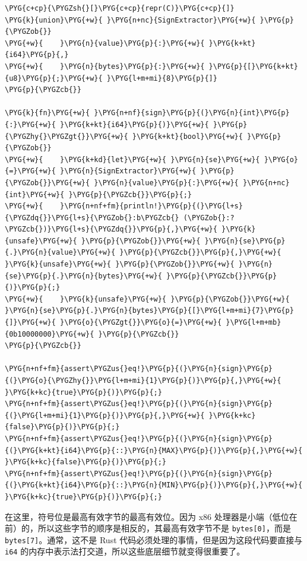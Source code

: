 \begin{Verbatim}[commandchars=\\\{\},breaklines=true,breakanywhere=true,fontsize=\codefont,xleftmargin=17bp]
\PYG{c+cp}{\PYGZsh{}[}\PYG{c+cp}{repr(C)}\PYG{c+cp}{]}
\PYG{k}{union}\PYG{+w}{ }\PYG{n+nc}{SignExtractor}\PYG{+w}{ }\PYG{p}{\PYGZob{}}
\PYG{+w}{    }\PYG{n}{value}\PYG{p}{:}\PYG{+w}{ }\PYG{k+kt}{i64}\PYG{p}{,}
\PYG{+w}{    }\PYG{n}{bytes}\PYG{p}{:}\PYG{+w}{ }\PYG{p}{[}\PYG{k+kt}{u8}\PYG{p}{;}\PYG{+w}{ }\PYG{l+m+mi}{8}\PYG{p}{]}
\PYG{p}{\PYGZcb{}}

\PYG{k}{fn}\PYG{+w}{ }\PYG{n+nf}{sign}\PYG{p}{(}\PYG{n}{int}\PYG{p}{:}\PYG{+w}{ }\PYG{k+kt}{i64}\PYG{p}{)}\PYG{+w}{ }\PYG{p}{\PYGZhy{}\PYGZgt{}}\PYG{+w}{ }\PYG{k+kt}{bool}\PYG{+w}{ }\PYG{p}{\PYGZob{}}
\PYG{+w}{    }\PYG{k+kd}{let}\PYG{+w}{ }\PYG{n}{se}\PYG{+w}{ }\PYG{o}{=}\PYG{+w}{ }\PYG{n}{SignExtractor}\PYG{+w}{ }\PYG{p}{\PYGZob{}}\PYG{+w}{ }\PYG{n}{value}\PYG{p}{:}\PYG{+w}{ }\PYG{n+nc}{int}\PYG{+w}{ }\PYG{p}{\PYGZcb{}}\PYG{p}{;}
\PYG{+w}{    }\PYG{n+nf+fm}{println!}\PYG{p}{(}\PYG{l+s}{\PYGZdq{}}\PYG{l+s}{\PYGZob{}:b\PYGZcb{} (\PYGZob{}:?\PYGZcb{})}\PYG{l+s}{\PYGZdq{}}\PYG{p}{,}\PYG{+w}{ }\PYG{k}{unsafe}\PYG{+w}{ }\PYG{p}{\PYGZob{}}\PYG{+w}{ }\PYG{n}{se}\PYG{p}{.}\PYG{n}{value}\PYG{+w}{ }\PYG{p}{\PYGZcb{}}\PYG{p}{,}\PYG{+w}{ }\PYG{k}{unsafe}\PYG{+w}{ }\PYG{p}{\PYGZob{}}\PYG{+w}{ }\PYG{n}{se}\PYG{p}{.}\PYG{n}{bytes}\PYG{+w}{ }\PYG{p}{\PYGZcb{}}\PYG{p}{)}\PYG{p}{;}
\PYG{+w}{    }\PYG{k}{unsafe}\PYG{+w}{ }\PYG{p}{\PYGZob{}}\PYG{+w}{ }\PYG{n}{se}\PYG{p}{.}\PYG{n}{bytes}\PYG{p}{[}\PYG{l+m+mi}{7}\PYG{p}{]}\PYG{+w}{ }\PYG{o}{\PYGZgt{}}\PYG{o}{=}\PYG{+w}{ }\PYG{l+m+mb}{0b10000000}\PYG{+w}{ }\PYG{p}{\PYGZcb{}}
\PYG{p}{\PYGZcb{}}

\PYG{n+nf+fm}{assert\PYGZus{}eq!}\PYG{p}{(}\PYG{n}{sign}\PYG{p}{(}\PYG{o}{\PYGZhy{}}\PYG{l+m+mi}{1}\PYG{p}{)}\PYG{p}{,}\PYG{+w}{ }\PYG{k+kc}{true}\PYG{p}{)}\PYG{p}{;}
\PYG{n+nf+fm}{assert\PYGZus{}eq!}\PYG{p}{(}\PYG{n}{sign}\PYG{p}{(}\PYG{l+m+mi}{1}\PYG{p}{)}\PYG{p}{,}\PYG{+w}{ }\PYG{k+kc}{false}\PYG{p}{)}\PYG{p}{;}
\PYG{n+nf+fm}{assert\PYGZus{}eq!}\PYG{p}{(}\PYG{n}{sign}\PYG{p}{(}\PYG{k+kt}{i64}\PYG{p}{::}\PYG{n}{MAX}\PYG{p}{)}\PYG{p}{,}\PYG{+w}{ }\PYG{k+kc}{false}\PYG{p}{)}\PYG{p}{;}
\PYG{n+nf+fm}{assert\PYGZus{}eq!}\PYG{p}{(}\PYG{n}{sign}\PYG{p}{(}\PYG{k+kt}{i64}\PYG{p}{::}\PYG{n}{MIN}\PYG{p}{)}\PYG{p}{,}\PYG{+w}{ }\PYG{k+kc}{true}\PYG{p}{)}\PYG{p}{;}
\end{Verbatim}

在这里，符号位是最高有效字节的最高有效位。因为 x86 处理器是小端（低位在前）的，所以这些字节的顺序是相反的，其最高有效字节不是 \texttt{bytes[0]}，而是 \texttt{bytes[7]}。通常，这不是 Rust 代码必须处理的事情，但是因为这段代码要直接与 \texttt{i64} 的内存中表示法打交道，所以这些底层细节就变得很重要了。

